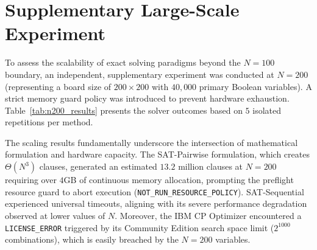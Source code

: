 \section{Supplementary Large-Scale Experiment}
\label{sec:large_scale}

To assess the scalability of exact solving paradigms beyond the $N=100$ boundary, an independent, supplementary experiment was conducted at $N=200$ (representing a board size of $200 \times 200$ with $40,000$ primary Boolean variables). A strict memory guard policy was introduced to prevent hardware exhaustion. Table~\ref{tab:n200_results} presents the solver outcomes based on $5$ isolated repetitions per method.

\begin{table}[!htbp]
\centering
\caption{Large-scale experimental outcomes at $N=200$. Medians and means calculated over successful trials only.}
\label{tab:n200_results}
\end{table}

The scaling results fundamentally underscore the intersection of mathematical formulation and hardware capacity. The SAT-Pairwise formulation, which creates $\Theta(N^3)$ clauses, generated an estimated $13.2$ million clauses at $N=200$ requiring over $4$GB of continuous memory allocation, prompting the preflight resource guard to abort execution (\texttt{NOT\_RUN\_RESOURCE\_POLICY}). SAT-Sequential experienced universal timeouts, aligning with its severe performance degradation observed at lower values of $N$. Moreover, the IBM CP Optimizer encountered a \texttt{LICENSE\_ERROR} triggered by its Community Edition search space limit ($2^{1000}$ combinations), which is easily breached by the $N=200$ variables. 

